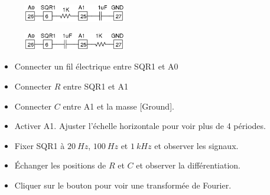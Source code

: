 \documentclass{book}
\begin{document}
\begin{figure}[h!]
\begin{center}
\caption{\label{} }\vspace{0.5em}
\includegraphics[width=0.4\textwidth, height=0.3\textwidth, keepaspectratio]{Schematic-rc-integ.png}
\end{center}
\end{figure}



\begin{figure}[h!]
\begin{center}
\caption{\label{} }\vspace{0.5em}
\includegraphics[width=0.4\textwidth, height=0.3\textwidth, keepaspectratio]{Schematic-rc-diff.png}
\end{center}
\end{figure}



\begin{itemize}
  \item Connecter un fil électrique entre SQR1 et A0
  \item Connecter $R$ entre SQR1 et A1
  \item Connecter $C$ entre A1 et la masse [Ground].
  \item Activer A1. Ajuster l'échelle horizontale pour voir plus de 4 périodes.
  \item Fixer SQR1 à $20\ Hz$, $100\ Hz$ et $1\ kHz$ et observer les signaux.
  \item Échanger les positions de $R$ et $C$ et observer la différentiation.
  \item Cliquer sur le bouton   pour voir une transformée de Fourier.
\end{itemize}
\end{document}
